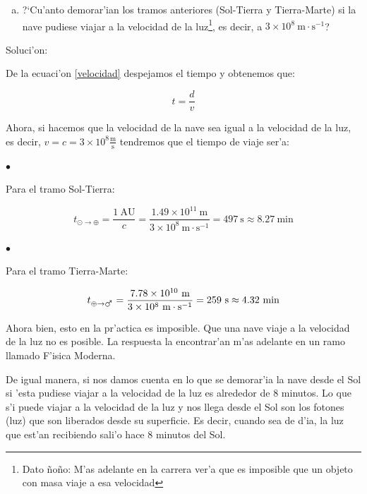 \documentclass{article}
\begin{document}
\begin{enumerate} [a)]
De manera que obtenemos que la nave, si mantiene una rapidez constante a lo largo de su viaje, demorar'a un poco m'as de un a'no en llegar hasta Marte.

\item ?`Cu'anto demorar'ian los tramos anteriores (Sol-Tierra y Tierra-Marte) si la nave pudiese viajar a la velocidad de la luz\footnote{Dato ñoño: M'as adelante en la carrera ver'a que es imposible que un objeto con masa viaje a esa velocidad}, es decir, a $3 \times 10^8 \ \text{m}\cdot \text{s}^{-1}$? 
\end{enumerate}

\vspace{2mm}

Soluci'on:

De la ecuaci'on \eqref{velocidad} despejamos el tiempo y obtenemos que:

\begin{equation} \label{tiempo}
t = \frac{d}{v}
\end{equation}

Ahora, si hacemos que la velocidad de la nave sea igual a la velocidad de la luz, es decir, $v = c = 3 \times 10^8 \frac{\text{m}}{\text{s}}$ tendremos que el tiempo de viaje ser'a:

{\begin{small}
$\bullet$
\end{small}}Para el tramo Sol-Tierra:

\begin{equation*}
t_{\odot \rightarrow \oplus} = \frac{1 \ \text{AU}}{c} = \frac{1.49 \times 10^{11} \ \text{m}}{3 \times 10^8 \ \text{m} \cdot \text{s}^{-1}} = 497 \ \text{s} \approx 8.27 \ \text{min}
\end{equation*}

{\begin{small}
$\bullet$
\end{small}}Para el tramo Tierra-Marte:


\begin{equation*}
t_{\oplus \rightarrow \mars} = \frac{7.78 \times 10^{10} \ \text{m}}{3 \times 10^8 \ \text{m} \cdot \text{s}^{-1}} = 259 \ \text{s} \approx 4.32 \ \text{min}
\end{equation*}

Ahora bien, esto en la pr'actica es imposible. Que una nave viaje a la velocidad de la luz no es posible. La respuesta la encontrar'an m'as adelante en un ramo llamado F'isica Moderna.

De igual manera, si nos damos cuenta en lo que se demorar'ia la nave desde el Sol si 'esta pudiese viajar a la velocidad de la luz es alrededor de 8 minutos. Lo que s'i puede viajar a la velocidad de la luz y nos llega desde el Sol son los fotones (luz) que son liberados desde su superficie. Es decir, cuando sea de d'ia, la luz que est'an recibiendo sali'o hace 8 minutos del Sol.
\end{document}
